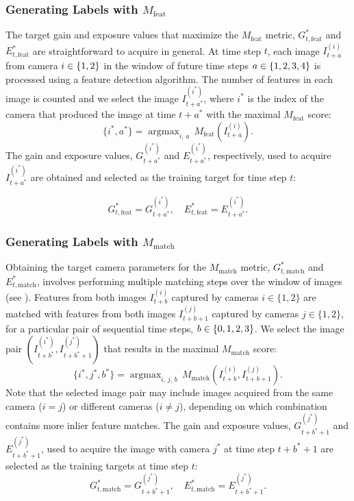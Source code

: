 \documentclass[letterpaper, 10pt, journal, twoside]{IEEEtran}
\DeclareMathOperator*{\argmax}{argmax}
\begin{document}
\subsubsection{Generating Labels with $M_{\text{feat}}$}

The target gain and exposure values that maximize the $M_{\text{feat}}$ metric, $G^*_{t,\text{feat}}$ and $E^*_{t,\text{feat}}$ are straightforward to acquire in general. At time step $t$, each image $I^{(i)}_{t+a}$ from camera $i \in \left\{1,2\right\}$ in the window of future time steps $a \in \left\{1,2,3,4\right\}$ is processed using a feature detection algorithm. 
The number of features in each image is counted and we select the image $I^{(i^*)}_{t+a^*}$, where $i^*$ is the index of the camera that produced the image at time $t+a^*$ with the maximal $M_{\text{feat}}$ score:
%
\begin{equation}
\{i^*, a^*\} = \argmax_{i,\,a}\,M_{\text{feat}}(I^{(i)}_{t+a}).
\end{equation}
%
The gain and exposure values, $G^{(i^*)}_{t+a^*}$ and $E^{(i^*)}_{t+a^*}$, respectively, used to acquire $I^{(i^*)}_{t+a^*}$ are obtained and selected as the training target for time step $t$:

\begin{equation}
G_{t,\text{feat}}^* = G^{(i^*)}_{t+a^*}, \quad E_{t,\text{feat}}^* = E^{(i^*)}_{t+a^*}. 
\end{equation}

\subsubsection{Generating Labels with $M_{\text{match}}$}

Obtaining the target camera parameters for the $M_{\text{match}}$ metric, $G^*_{t,\text{match}}$ and $E^*_{t,\text{match}}$, involves performing multiple matching steps over the window of images (see ). 
Features from both images $I^{(i)}_{t+b}$ captured by cameras $i \in \{1,2\}$ are matched with features from both images $I^{(j)}_{t+b+1}$ captured by cameras $j \in \{1,2\}$, for a particular pair of sequential time steps, $b \in \left\{0,1,2,3\right\}$. 
We select the image pair $(I^{(i^*)}_{t+b^*}, I^{(j^*)}_{t+b^*+1})$ that results in the maximal $M_{\text{match}}$ score:
%
\begin{equation}
\{i^*, j^*, b^*\} = \argmax_{i,\, j,\, b}\,M_{\text{match}}(I^{(i)}_{t+b}, I^{(j)}_{t+b+1}).
\end{equation}
%
Note that the selected image pair may include images acquired from the same camera ($i = j$) or different cameras ($i \neq j$), depending on which combination contains more inlier feature matches.
The gain and exposure values, $G^{(j^*)}_{t+b^*+1}$ and $E^{(j^*)}_{t+b^*+1}$, used to acquire the image with camera $j^*$ at time step $t+b^*+1$ are selected as the training targets at time step $t$: 
\begin{equation}
G_{t,\text{match}}^* = G^{(j^*)}_{t+b^*+1},\quad 
E_{t,\text{match}}^* = E^{(j^*)}_{t+b^*+1}.
\end{equation}
\end{document}
